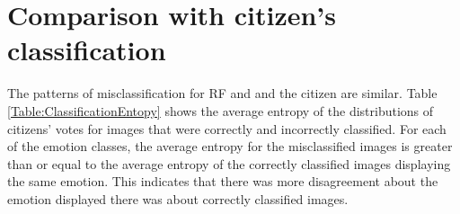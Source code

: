 \section{Comparison with citizen's classification}
\label{sec:Comparison_citizen}

The patterns of misclassification for RF and and the citizen are similar.
Table \ref{Table:ClassificationEntopy} shows the average entropy of the distributions of citizens' votes for images that were correctly and incorrectly classified.  For each of the emotion classes, the average entropy for the misclassified images is greater than or equal to the average entropy of the correctly classified images displaying the same emotion.  This indicates that there was more disagreement about the emotion displayed there was about correctly classified images.






%
%
%


